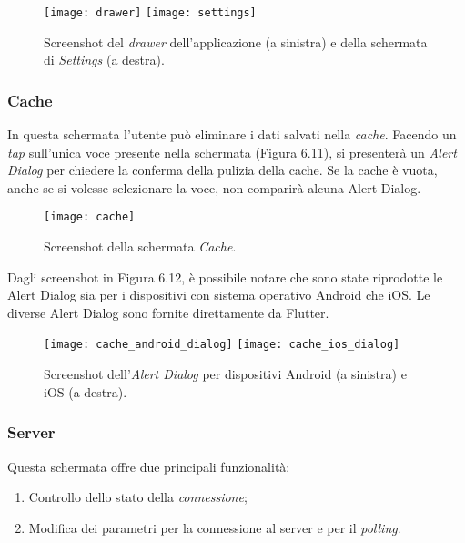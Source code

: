 \begin{figure}[htp]
	\centering
	\texttt{[image: drawer]}
	\texttt{[image: settings]}
	\caption[Screenshot - Drawer e della schermata Settings]{Screenshot del \textit{drawer} dell'applicazione (a sinistra) e della schermata di \textit{Settings} (a destra).}\label{xyz}
\end{figure}

\newpage

\subsubsection{Cache}
In questa schermata l'utente può eliminare i dati salvati nella \textit{cache}. Facendo un \textit{tap} sull'unica voce presente nella schermata (Figura 6.11), si presenterà un \textit{Alert Dialog} per chiedere la conferma della pulizia della cache. Se la cache è vuota, anche se si volesse selezionare la voce, non comparirà alcuna Alert Dialog.

\begin{figure}
	\begin{center}
		\texttt{[image: cache]}
		\caption[Screenshot - Cache]{Screenshot della schermata \textit{Cache}.}
		\label{figura:cache}
	\end{center}
\end{figure}

Dagli screenshot in Figura 6.12, è possibile notare che sono state riprodotte le Alert Dialog sia per i dispositivi con sistema operativo Android che iOS. Le diverse Alert Dialog sono fornite direttamente da Flutter.

\begin{figure}[htp]
	\centering
	\texttt{[image: cache\_android\_dialog]}
	\texttt{[image: cache\_ios\_dialog]}
	\caption[Screenshot - Alert Dialog in Android e iOS della schermata Cache]{Screenshot dell'\textit{Alert Dialog} per dispositivi Android (a sinistra) e iOS (a destra).}\label{xyz}
\end{figure}

\newpage

\subsubsection{Server}
Questa schermata offre due principali funzionalità:
\begin{enumerate}
	\item Controllo dello stato della \textit{connessione};
	\item Modifica dei parametri per la connessione al server e per il \textit{polling}.
\end{enumerate}

